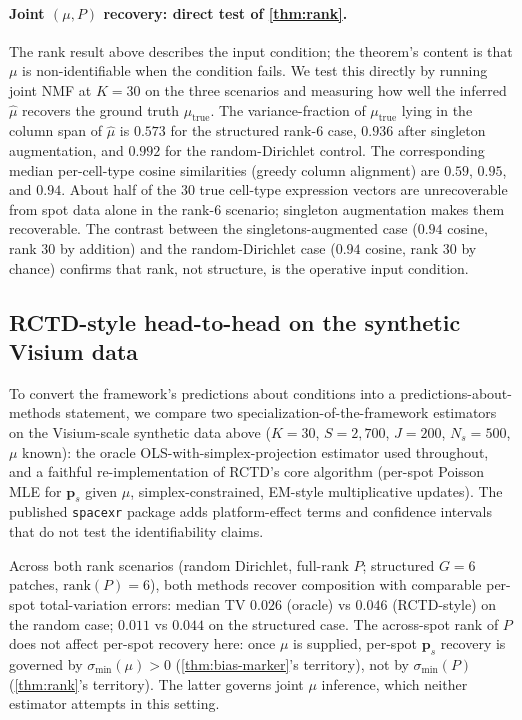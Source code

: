 \paragraph{Joint $(\mu, P)$ recovery: direct test of
\cref{thm:rank}.} The rank result above describes the input
condition; the theorem's content is that $\mu$ is non-identifiable
when the condition fails. We test this directly by running joint
NMF at $K = 30$ on the three scenarios and measuring how well the
inferred $\hat\mu$ recovers the ground truth $\mu_{\text{true}}$.
The variance-fraction of $\mu_{\text{true}}$ lying in the column
span of $\hat\mu$ is $0.573$ for the structured rank-$6$ case,
$0.936$ after singleton augmentation, and $0.992$ for the
random-Dirichlet control. The corresponding median per-cell-type
cosine similarities (greedy column alignment) are $0.59$, $0.95$,
and $0.94$. About half of the $30$ true cell-type expression
vectors are unrecoverable from spot data alone in the rank-$6$
scenario; singleton augmentation makes them recoverable. The
contrast between the singletons-augmented case ($0.94$ cosine, rank
$30$ by addition) and the random-Dirichlet case ($0.94$ cosine,
rank $30$ by chance) confirms that rank, not structure, is the
operative input condition.

\subsection{RCTD-style head-to-head on the synthetic Visium data}

To convert the framework's predictions about conditions into a
predictions-about-methods statement, we compare two
specialization-of-the-framework estimators on the Visium-scale
synthetic data above ($K = 30$, $S = 2{,}700$, $J = 200$, $N_s =
500$, $\mu$ known): the oracle OLS-with-simplex-projection
estimator used throughout, and a faithful re-implementation of
RCTD's core algorithm (per-spot Poisson MLE for $\bm p_s$ given
$\mu$, simplex-constrained, EM-style multiplicative updates). The
published \texttt{spacexr} package adds platform-effect terms and
confidence intervals that do not test the identifiability claims.

Across both rank scenarios (random Dirichlet, full-rank $P$;
structured $G = 6$ patches, $\mathrm{rank}(P) = 6$), both methods
recover composition with comparable per-spot total-variation
errors: median TV $0.026$ (oracle) vs $0.046$ (RCTD-style) on the
random case; $0.011$ vs $0.044$ on the structured case. The
across-spot rank of $P$ does not affect per-spot recovery here:
once $\mu$ is supplied, per-spot $\bm p_s$ recovery is governed by
$\sigma_{\min}(\mu) > 0$ (\cref{thm:bias-marker}'s territory), not
by $\sigma_{\min}(P)$ (\cref{thm:rank}'s territory). The latter
governs joint $\mu$ inference, which neither estimator attempts in
this setting.

